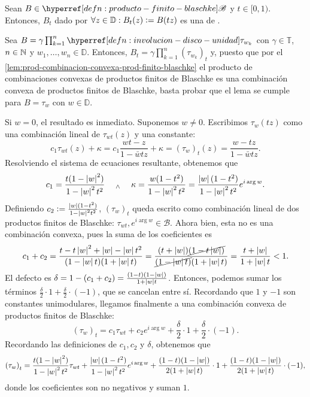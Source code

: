 \begin{lem}\label{lem:dilatacion-prod-finito-blaschke}
    Sean $B \in \exhyperref[defn:producto-finito-blaschke]{producto-finito-blaschke}{\mathscr{B}}$ y $t \in [0, 1)$. Entonces, $B_t$ dado por $\forall z \in \mathbb{D} : B_t(z) \vcentcolon= B(tz)$ es una  de .
\end{lem}
\begin{dem}
    Sea $B = \gamma \prod_{k=1}^n \exhyperref[defn:involucion-disco-unidad]{involucion-disco-unidad}{\tau_{w_k}}$ con $\gamma \in \mathbb{T}$, $n \in \mathbb{N}$ y $w_1, \dots, w_n \in \mathbb{D}$. Entonces, $B_t = \gamma \prod_{k=1}^n (\tau_{w_k})_t$ y, puesto que por el \cref{lem:prod-combinacion-convexa-prod-finito-blaschke} el producto de combinaciones convexas de productos finitos de Blaschke es una combinación convexa de productos finitos de Blaschke, basta probar que el lema se cumple para $B = \tau_w$ con $w \in \mathbb{D}$.

    Si $w = 0$, el resultado es inmediato. Suponemos $w \neq 0$. Escribimos $\tau_w(tz)$ como una combinación lineal de $\tau_{wt}(z)$ y una constante:
    \[
    c_1 \tau_{wt}(z) + \kappa = c_1 \frac{wt - z}{1 - \bar{w} t z} + \kappa = (\tau_w)_t(z) = \frac{w - t z}{1 - \bar{w} t z}.
    \]
    Resolviendo el sistema de ecuaciones resultante, obtenemos que
    \[
    c_1 = \frac{t(1 - \left|w\right|^2)}{1 - \left|w\right|^2 t^2} \quad \; _{\wedge} \; \quad \kappa = \frac{w(1 - t^2)}{1 - \left|w\right|^2 t^2} = \frac{\left|w\right|(1 - t^2)}{1 - \left|w\right|^2 t^2} e^{i \arg w}.
    \]
    Definiendo $c_2 \vcentcolon= \frac{\left|w\right|(1 - t^2)}{1 - \left|w\right|^2 t^2}$, $(\tau_w)_t$ queda escrito como combinación lineal de dos productos finitos de Blaschke: $\tau_{wt}, e^{i \arg w} \in \mathscr{B}$.
    Ahora bien, esta no es una combinación convexa, pues la suma de los coeficientes es
    \[  
    c_1 + c_2 = \frac{t - t\left|w\right|^2 + \left|w\right| - \left|w\right|t^2}{(1 - \left|w\right|t)(1 + \left|w\right|t)} = \frac{(t + \left|w\right|)\cancel{(1 - t\left|w\right|)}}{\cancel{(1 - \left|w\right|t)}(1 + \left|w\right|t)} = \frac{t + \left|w\right|}{1 + \left|w\right|t} < 1.
    \]
    El defecto es $\delta = 1 - (c_1 + c_2) = \frac{(1-t)(1-\left|w\right|)}{1 + \left|w\right|t}$. Entonces, podemos sumar los términos $\frac{\delta}{2} \cdot 1 + \frac{\delta}{2} \cdot (-1)$, que se cancelan entre sí. Recordando que $1$ y $-1$ son constantes unimodulares, llegamos finalmente a una combinación convexa de productos finitos de Blaschke:
    \[
    {(\tau_w)}_t = c_1 \tau_{wt} + c_2 e^{i \arg w} + \frac{\delta}{2} \cdot 1 + \frac{\delta}{2} \cdot (-1).
    \]
    Recordando las definiciones de $c_1, c_2$ y $\delta$, obtenemos que
    \[
    {(\tau_w)}_t = \frac{t(1 - \left|w\right|^2)}{1 - \left|w\right|^2 t^2} \tau_{wt} + \frac{\left|w\right|(1 - t^2)}{1 - \left|w\right|^2 t^2} e^{i \arg w} + \frac{(1-t)(1-\left|w\right|)}{2(1 + \left|w\right|t)} \cdot 1 + \frac{(1-t)(1-\left|w\right|)}{2(1 + \left|w\right|t)} \cdot (-1),
    \]
    donde los coeficientes son no negativos y suman $1$. 
    \hfill\qedsymbol
\end{dem}

